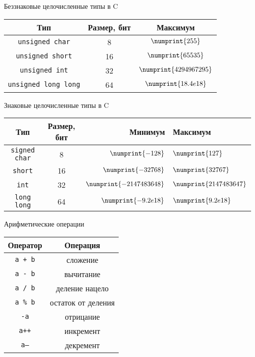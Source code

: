 \documentclass{beamer}
\newcommand{\num}[1]{\numprint{#1}}
\newcommand{\code}[1]{\texttt{#1}}
\begin{document}
\begin{frame}{Беззнаковые целочисленные типы в C}

  \begin{table}
    \begin{tabular}{ccc}
      \hline
      Тип              & Размер, бит & Максимум  \\
      \hline
      \code{unsigned char}      & 8  & $\num{255}$ \\
      \code{unsigned short}     & 16 & $\num{65535}$ \\
      \code{unsigned int}       & 32 & $\num{4294967295}$ \\
      \code{unsigned long long} & 64 & $\num{18.4e18}$ \\
      \hline
    \end{tabular}
  \end{table}

\end{frame}

\begin{frame}{Знаковые целочисленные типы в C}

  \begin{table}
    \begin{tabular}{ccrl}
      \hline
      Тип              & Размер, бит & Минимум             & Максимум  \\
      \hline
      \code{signed char}        & 8  & $\num{-128}$        & $\num{127}$ \\
      \code{short}              & 16 & $\num{-32768}$      & $\num{32767}$ \\
      \code{int}                & 32 & $\num{-2147483648}$ & $\num{2147483647}$ \\
      \code{long long}          & 64 & $\num{-9.2e18}$     & $\num{9.2e18}$ \\
      \hline
    \end{tabular}
  \end{table}

\end{frame}

\begin{frame}{Арифметические операции}

  \begin{table}
    \begin{tabular}{cc}
      \hline
      Оператор      & Операция \\
      \hline
      \code{a + b}  & сложение \\
      \code{a - b}  & вычитание \\
      \code{a / b}  & деление нацело \\
      \code{a \% b} & остаток от деления \\
      \code{-a}     & отрицание \\
      \code{a++}    & инкремент \\
      \code{a--}    & декремент \\
      \hline
    \end{tabular}
  \end{table}

\end{frame}
\end{document}
